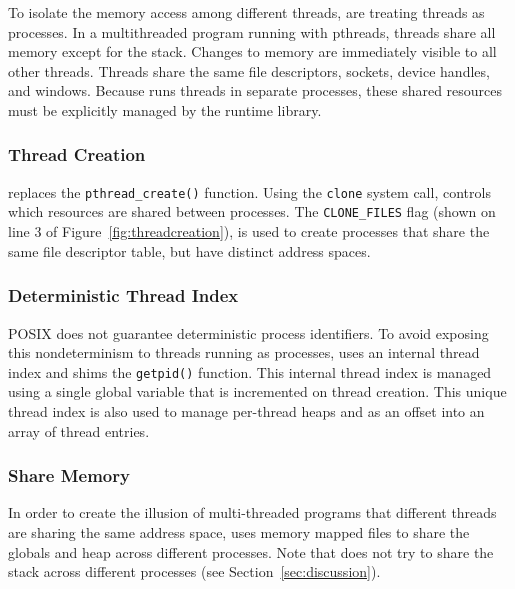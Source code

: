 To isolate the memory access among different threads, \dthreads{} are treating threads as processes.
In a multithreaded program running with pthreads, threads share all memory except for the stack.  Changes to memory are immediately visible to all other threads.  Threads share the same file descriptors, sockets, device handles, and windows.  Because \dthreads{} runs threads in separate processes, these shared resources must be explicitly managed by the runtime library.

\subsubsection{Thread Creation}
\dthreads{} replaces the \texttt{pthread\_create()} function.  Using the \texttt{clone} system call, \dthreads{} controls which resources are shared between processes.  The \texttt{CLONE\_FILES} flag (shown on line 3 of Figure~\ref{fig:threadcreation}), is used to create processes that share the same file descriptor table, but have distinct address spaces.

\subsubsection{Deterministic Thread Index}
\label{sec:threadindex}
POSIX does not guarantee deterministic process identifiers.  To avoid exposing this nondeterminism to threads running as processes, \dthreads{} uses an internal thread index and shims the \texttt{getpid()} function.  This internal thread index is managed using a single global variable that is incremented on thread creation.  This unique thread index is also used to manage per-thread heaps and as an offset into an array of thread entries.

\subsubsection{Share Memory}
\label{sec:stackandheap}

In order to create the illusion of multi-threaded programs that
different threads are sharing the same address space, \dthreads{} uses
memory mapped files to share the globals and heap across different
processes. Note that \dthreads{} does not try to share the stack across
different processes (see Section~\ref{sec:discussion}).

